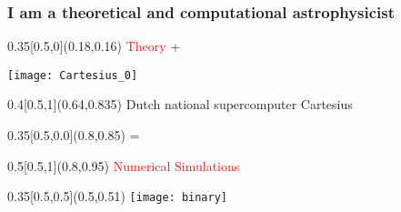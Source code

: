 \documentclass[xcolor=dvipsnames,professionalfonts, aspectratio=169]{beamer}
\begin{document}
\bgroup
{}
\begin{frame}[plain]

\end{frame}
\egroup

\begin{frame}

  \frametitle{I am a theoretical and computational astrophysicist}
  \centering
  \begin{textblock}{0.35}[0.5,0](0.18,0.16)
    \Large  \textcolor{red}{Theory} +
  \end{textblock}

  \texttt{[image: Cartesius\_0]}\\

  \begin{textblock}{0.4}[0.5,1](0.64,0.835)
    \color{black} \tiny Dutch national supercomputer Cartesius
  \end{textblock}

  \begin{textblock}{0.35}[0.5,0.0](0.8,0.85)
    \Large =
  \end{textblock}

  \begin{textblock}{0.5}[0.5,1](0.8,0.95)
    \textcolor{red}{ \Large Numerical Simulations\phantom{A}}
  \end{textblock}


  \begin{textblock}{0.35}[0.5,0.5](0.5,0.51)
    \texttt{[image: binary]}
  \end{textblock}

\end{frame}
\end{document}
